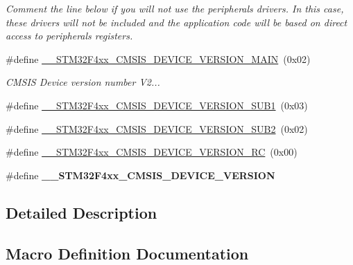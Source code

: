 \begin{DoxyCompactItemize}
\begin{DoxyCompactList}\small\item\em Comment the line below if you will not use the peripherals drivers. In this case, these drivers will not be included and the application code will be based on direct access to peripherals registers. \end{DoxyCompactList}\item 
\#define \hyperlink{group___library__configuration__section_ga802582d9b7b4dea8c8c53f6ce296dad2}{\+\_\+\+\_\+\+S\+T\+M32\+F4xx\+\_\+\+C\+M\+S\+I\+S\+\_\+\+D\+E\+V\+I\+C\+E\+\_\+\+V\+E\+R\+S\+I\+O\+N\+\_\+\+M\+A\+IN}~(0x02)
\begin{DoxyCompactList}\small\item\em C\+M\+S\+IS Device version number V2... \end{DoxyCompactList}\item 
\#define \hyperlink{group___library__configuration__section_gaa840ca8cc59044a45c604b95c546666b}{\+\_\+\+\_\+\+S\+T\+M32\+F4xx\+\_\+\+C\+M\+S\+I\+S\+\_\+\+D\+E\+V\+I\+C\+E\+\_\+\+V\+E\+R\+S\+I\+O\+N\+\_\+\+S\+U\+B1}~(0x03)
\item 
\#define \hyperlink{group___library__configuration__section_ga5697f6bbcd478565105f00c06dc97a96}{\+\_\+\+\_\+\+S\+T\+M32\+F4xx\+\_\+\+C\+M\+S\+I\+S\+\_\+\+D\+E\+V\+I\+C\+E\+\_\+\+V\+E\+R\+S\+I\+O\+N\+\_\+\+S\+U\+B2}~(0x02)
\item 
\#define \hyperlink{group___library__configuration__section_ga99153b788b5b5ef1d65a748495e5c4ca}{\+\_\+\+\_\+\+S\+T\+M32\+F4xx\+\_\+\+C\+M\+S\+I\+S\+\_\+\+D\+E\+V\+I\+C\+E\+\_\+\+V\+E\+R\+S\+I\+O\+N\+\_\+\+RC}~(0x00)
\item 
\#define {\bfseries \+\_\+\+\_\+\+S\+T\+M32\+F4xx\+\_\+\+C\+M\+S\+I\+S\+\_\+\+D\+E\+V\+I\+C\+E\+\_\+\+V\+E\+R\+S\+I\+ON}
\end{DoxyCompactItemize}


\subsection{Detailed Description}


\subsection{Macro Definition Documentation}
